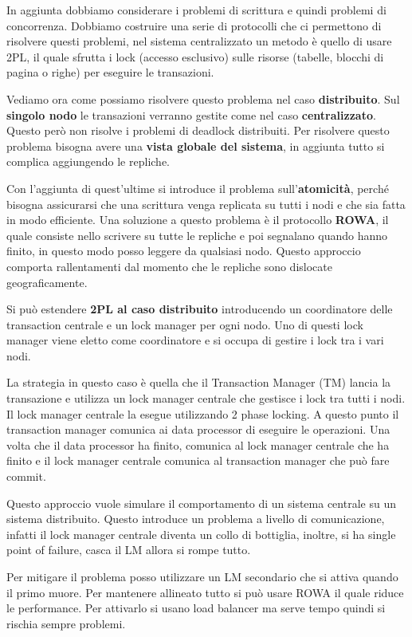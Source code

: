 In aggiunta dobbiamo considerare i problemi di scrittura e quindi problemi di
concorrenza. Dobbiamo costruire una serie di protocolli che ci permettono di
risolvere questi problemi, nel sistema centralizzato un metodo è quello di usare
2PL, il quale sfrutta i lock (accesso esclusivo) sulle risorse (tabelle, blocchi
di pagina o righe) per eseguire le transazioni.

Vediamo ora come possiamo risolvere questo problema nel caso \textbf{distribuito}. Sul
\textbf{singolo nodo} le transazioni verranno gestite come nel caso \textbf{centralizzato}. Questo
però non risolve i problemi di deadlock distribuiti. Per risolvere questo problema
bisogna avere una \textbf{vista globale del sistema}, in aggiunta tutto si complica
aggiungendo le repliche.

Con l'aggiunta di quest'ultime si introduce il problema sull'\textbf{atomicità}, perché
bisogna assicurarsi che una scrittura venga replicata su tutti i nodi e che sia
fatta in modo efficiente. Una soluzione a questo problema è il protocollo \textbf{ROWA},
il quale consiste nello scrivere su tutte le repliche e poi segnalano quando
hanno finito, in questo modo posso leggere da qualsiasi nodo. Questo approccio
comporta rallentamenti dal momento che le repliche sono dislocate geograficamente.

Si può estendere \textbf{2PL al caso distribuito} introducendo un coordinatore delle
transaction centrale e un lock manager per ogni nodo. Uno di questi lock manager
viene eletto come coordinatore e si occupa di gestire i lock tra i vari nodi.

La strategia in questo caso è quella che il Transaction Manager (TM) lancia la
transazione e utilizza un lock manager centrale che gestisce i lock tra tutti i
nodi. Il lock manager centrale la esegue utilizzando 2 phase locking. A questo
punto il transaction manager comunica ai data processor di eseguire le operazioni.
Una volta che il data processor ha finito, comunica al lock manager centrale che
ha finito e il lock manager centrale comunica al transaction manager che può fare
commit.

Questo approccio vuole simulare il comportamento di un sistema centrale su un
sistema distribuito. Questo introduce un problema a livello di comunicazione,
infatti il lock manager centrale diventa un collo di bottiglia, inoltre, si ha
single point of failure, casca il LM allora si rompe tutto.

Per mitigare il problema posso utilizzare un LM secondario che si attiva quando
il primo muore. Per mantenere allineato tutto si può usare ROWA il quale riduce
le performance. Per attivarlo si usano load balancer ma serve tempo quindi si
rischia sempre problemi.

